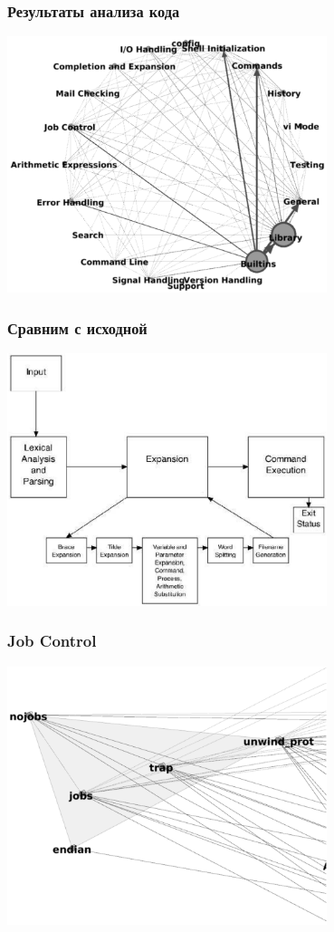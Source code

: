 \documentclass[xetex,mathserif,serif]{beamer}
\begin{document}
	\begin{frame}
		\frametitle{Результаты анализа кода}
		\begin{center}
			\includegraphics[width=0.7\textwidth]{bashAutomaticRecoveryArchitecture.png}
		\end{center}
	\end{frame}

	\begin{frame}
		\frametitle{Сравним с исходной}
		\begin{center}
			\includegraphics[width=0.7\textwidth]{bashArchitecture.png}
		\end{center}
	\end{frame}

	\begin{frame}
		\frametitle{Job Control}
		\begin{center}
			\includegraphics[width=0.7\textwidth]{bashJobControl.png}
		\end{center}
	\end{frame}
\end{document}

